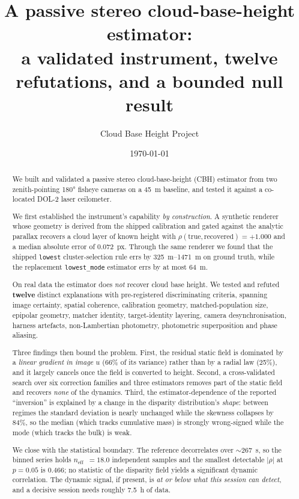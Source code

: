 \documentclass[11pt,a4paper]{article}
\title{\bfseries A passive stereo cloud-base-height estimator:\\
a validated instrument, twelve refutations, and a bounded null result}
\author[1]{Cloud Base Height Project}
\affil[1]{\small Stereo fisheye CBH programme --- \texttt{github.com/VanUST/clouds\_level\_research}, branch \texttt{dev}}
\date{\today}
\newcommand{\neff}{\ensuremath{n_{\mathrm{eff}}}}
\newcommand{\rhoS}{\ensuremath{\rho}}
\begin{document}
\maketitle

\begin{abstract}
\noindent
We built and validated a passive stereo cloud-base-height (CBH) estimator from two
zenith-pointing \ang{180} fisheye cameras on a \SI{45}{\metre} baseline, and tested it
against a co-located DOL-2 laser ceilometer.

We first established the instrument's capability \emph{by construction}. A synthetic renderer
whose geometry is derived from the shipped calibration and gated against the analytic parallax
recovers a cloud layer of known height with $\rhoS(\text{true},\text{recovered}) = +1.000$ and
a median absolute error of \SI{0.072}{px}. Through the same renderer we found that the shipped
\texttt{lowest} cluster-selection rule errs by \SIrange{325}{1471}{\metre} on ground truth,
while the replacement \texttt{lowest\_mode} estimator errs by at most \SI{64}{\metre}.

On real data the estimator does \emph{not} recover cloud base height. We tested and refuted
\textbf{twelve} distinct explanations with pre-registered discriminating criteria, spanning
image certainty, spatial coherence, calibration geometry, matched-population size, epipolar
geometry, matcher identity, target-identity layering, camera desynchronisation, harness
artefacts, non-Lambertian photometry, photometric superposition and phase aliasing.

Three findings then bound the problem. First, the residual static field is dominated by a
\emph{linear gradient in image $u$} (66\% of its variance) rather than by a radial law (25\%),
and it largely cancels once the field is converted to height. Second, a cross-validated search
over six correction families and three estimators removes part of the static field and
recovers \emph{none} of the dynamics. Third, the estimator-dependence of the reported
``inversion'' is explained by a change in the disparity distribution's \emph{shape}: between
regimes the standard deviation is nearly unchanged while the skewness collapses by 84\%, so
the median (which tracks cumulative mass) is strongly wrong-signed while the mode (which
tracks the bulk) is weak.

We close with the statistical boundary. The reference decorrelates over $\sim$\SI{267}{\second},
so the binned series holds \neff\ $=18.0$ independent samples and the smallest detectable
$|\rhoS|$ at $p=0.05$ is $0.466$; no statistic of the disparity field yields a significant
dynamic correlation. The dynamic signal, if present, is \emph{at or below what this session can
detect}, and a decisive session needs roughly \SI{7.5}{\hour} of data.


\end{abstract}
\end{document}
